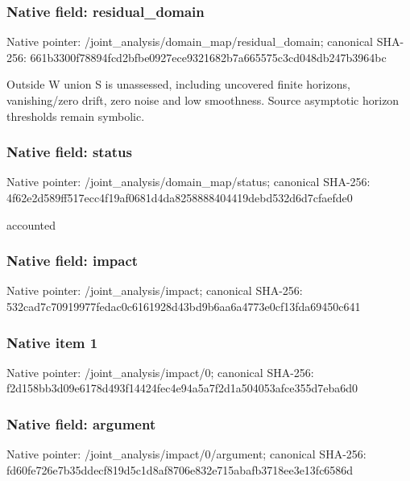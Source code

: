 \documentclass[10pt,a4paper]{article}
\begin{document}
\subsubsection{Native field: residual\_\allowbreak{}domain}
Native pointer: /joint\_\allowbreak{}analysis/domain\_\allowbreak{}map/residual\_\allowbreak{}domain; canonical SHA-256: 661b3300f78894fcd2bfbe0927ece9321682b7a665575c3cd048db247b3964bc

\begingroup\raggedright\sloppy Outside W union S is unassessed,\allowbreak{} including uncovered finite horizons,\allowbreak{} vanishing/\allowbreak{}zero drift,\allowbreak{} zero noise and low smoothness. Source asymptotic horizon thresholds remain symbolic.\par\endgroup

\subsubsection{Native field: status}
Native pointer: /joint\_\allowbreak{}analysis/domain\_\allowbreak{}map/status; canonical SHA-256: 4f62e2d589ff517ecc4f19af0681d4da8258888404419debd532d6d7cfaefde0

\begingroup\raggedright\sloppy accounted\par\endgroup

\subsubsection{Native field: impact}
Native pointer: /joint\_\allowbreak{}analysis/impact; canonical SHA-256: 532cad7c70919977fedac0c6161928d43bd9b6aa6a4773e0cf13fda69450c641

\subsubsection{Native item 1}
Native pointer: /joint\_\allowbreak{}analysis/impact/0; canonical SHA-256: f2d158bb3d09e6178d493f14424fec4e94a5a7f2d1a504053afce355d7eba6d0

\subsubsection{Native field: argument}
Native pointer: /joint\_\allowbreak{}analysis/impact/0/argument; canonical SHA-256: fd60fe726e7b35ddecf819d5c1d8af8706e832e715abafb3718ee3e13fc6586d
\end{document}
